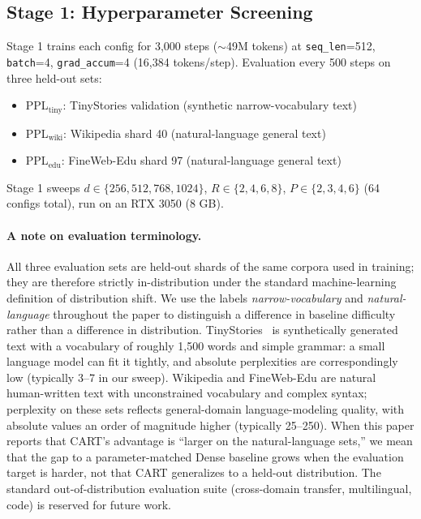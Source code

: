 \documentclass{article}
\newcommand{\cart}{\textsc{CART}}
\newcommand{\pplwiki}{PPL$_\text{wiki}$}
\newcommand{\ppltiny}{PPL$_\text{tiny}$}
\newcommand{\ppledu}{PPL$_\text{edu}$}
\begin{document}
\subsection{Stage 1: Hyperparameter Screening}

Stage 1 trains each config for 3{,}000 steps ($\sim$49M tokens) at \texttt{seq\_len}=512, \texttt{batch}=4, \texttt{grad\_accum}=4 (16{,}384 tokens/step). Evaluation every 500 steps on three held-out sets:
\begin{itemize}[leftmargin=*, topsep=2pt, itemsep=1pt]
  \item \ppltiny{}: TinyStories validation (synthetic narrow-vocabulary text)
  \item \pplwiki{}: Wikipedia shard 40 (natural-language general text)
  \item \ppledu{}: FineWeb-Edu shard 97 (natural-language general text)
\end{itemize}
Stage 1 sweeps $d \in \{256, 512, 768, 1024\}$, $R \in \{2, 4, 6, 8\}$, $P \in \{2, 3, 4, 6\}$ (64 configs total), run on an RTX 3050 (8 GB).

\paragraph{A note on evaluation terminology.}
\label{sec:eval_terminology}
All three evaluation sets are held-out shards of the same corpora used in training; they are therefore strictly in-distribution under the standard machine-learning definition of distribution shift. We use the labels \emph{narrow-vocabulary} and \emph{natural-language} throughout the paper to distinguish a difference in baseline difficulty rather than a difference in distribution. TinyStories~\citep{tinystories2023} is synthetically generated text with a vocabulary of roughly 1{,}500 words and simple grammar: a small language model can fit it tightly, and absolute perplexities are correspondingly low (typically 3--7 in our sweep). Wikipedia and FineWeb-Edu are natural human-written text with unconstrained vocabulary and complex syntax; perplexity on these sets reflects general-domain language-modeling quality, with absolute values an order of magnitude higher (typically 25--250). When this paper reports that \cart{}'s advantage is ``larger on the natural-language sets,'' we mean that the gap to a parameter-matched Dense baseline grows when the evaluation target is harder, not that \cart{} generalizes to a held-out distribution. The standard out-of-distribution evaluation suite (cross-domain transfer, multilingual, code) is reserved for future work.
\end{document}
